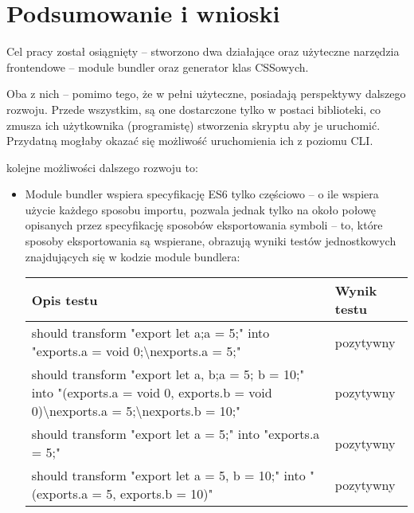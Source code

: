\documentclass{SGGW-thesis}
\begin{document}
\chapter{Podsumowanie i wnioski}
Cel pracy został osiągnięty -- stworzono dwa działające oraz użyteczne narzędzia frontendowe -- module bundler oraz generator klas CSSowych.

Oba z nich -- pomimo tego, że w pełni użyteczne, posiadają perspektywy dalszego rozwoju.
Przede wszystkim, są one dostarczone tylko w postaci biblioteki, co zmusza ich użytkownika (programistę) stworzenia skryptu aby je uruchomić. Przydatną mogłaby okazać się możliwość uruchomienia ich z poziomu CLI.

kolejne możliwości dalszego rozwoju to:
\begin{itemize}
    \item Module bundler wspiera specyfikację ES6 tylko częściowo -- o ile wspiera użycie każdego sposobu importu, pozwala jednak tylko na około połowę opisanych przez specyfikację sposobów eksportowania symboli -- to, które sposoby eksportowania są wspierane, obrazują wyniki testów jednostkowych znajdujących się w kodzie module bundlera:
        \begin{longtable}{|p{13cm}|p{2cm}|}
            \hline
            \textbf{Opis testu}                                                                                                                                              & \textbf{Wynik testu} \\ \hline
            \endfirsthead
            \endhead
            should transform "export let a;a = 5;" into "exports.a = void 0;\textbackslash{}nexports.a = 5;"                                                                 & pozytywny            \\ \hline
            should transform "export let a, b;a = 5; b = 10;" into "(exports.a = void 0, exports.b = void 0)\textbackslash{}nexports.a = 5;\textbackslash{}nexports.b = 10;" & pozytywny            \\ \hline
            should transform "export let a = 5;" into "exports.a = 5;"                                                                                                       & pozytywny            \\ \hline
            should transform "export let a = 5, b = 10;" into "(exports.a = 5, exports.b = 10)"                                                                              & pozytywny            \\ \hline

\end{longtable}
\end{itemize}
\end{document}
